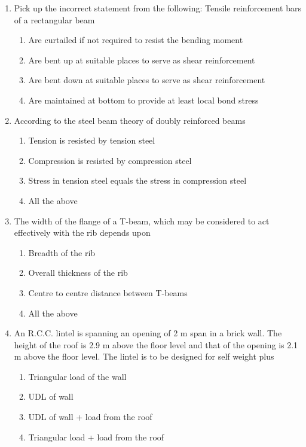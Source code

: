 \documentclass[11pt,a4paper]{article}
\begin{document}
\begin{enumerate}
\begin{enumerate*}[itemjoin=\qquad, label=\Alph*.]
\end{enumerate*}
\item{Pick up the incorrect statement from the following: Tensile reinforcement bars of a rectangular beam}
\begin{enumerate}[label=\Alph*.]
\item{Are curtailed if not required to resist the bending moment}
\item{Are bent up at suitable places to serve as shear reinforcement}
\item{Are bent down at suitable places to serve as shear reinforcement}
\item{Are maintained at bottom to provide at least local bond stress}
\end{enumerate}
\item{According to the steel beam theory of doubly reinforced beams}
\begin{enumerate}[label=\Alph*.]
\item{Tension is resisted by tension steel}
\item{Compression is resisted by compression steel}
\item{Stress in tension steel equals the stress in compression steel}
\item{All the above}
\end{enumerate}
\item{The width of the flange of a T-beam, which may be considered to act effectively with the rib depends upon}
\begin{enumerate}[label=\Alph*.]
\item{Breadth of the rib}
\item{Overall thickness of the rib}
\item{Centre to centre distance between T-beams}
\item{All the above}
\end{enumerate}
\item{An R.C.C. lintel is spanning an opening of 2 m span in a brick wall. The height of the roof is 2.9 m above the floor level and that of the opening is 2.1 m above the floor level. The lintel is to be designed for self weight plus}
\begin{enumerate}[label=\Alph*.]
\item{Triangular load of the wall}
\item{UDL of wall}
\item{UDL of wall + load from the roof}
\item{Triangular load + load from the roof}
\end{enumerate}

\end{enumerate}
\end{document}
